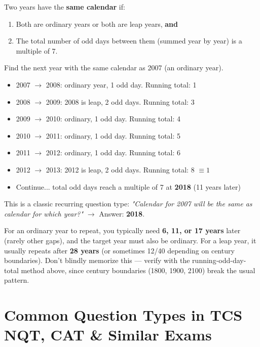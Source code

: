 \documentclass[11pt]{article}
\begin{document}
\begin{formulabox}[Rule]
Two years have the \textbf{same calendar} if:
\begin{enumerate}[leftmargin=1.4em]
  \item Both are ordinary years or both are leap years, \textbf{and}
  \item The total number of odd days between them (summed year by year) is a multiple of 7.
\end{enumerate}
\end{formulabox}

\begin{examplebox}[Example]
Find the next year with the same calendar as 2007 (an ordinary year).
\begin{itemize}[leftmargin=1.4em]
  \item 2007 $\to$ 2008: ordinary year, 1 odd day. Running total: 1
  \item 2008 $\to$ 2009: 2008 is leap, 2 odd days. Running total: 3
  \item 2009 $\to$ 2010: ordinary, 1 odd day. Running total: 4
  \item 2010 $\to$ 2011: ordinary, 1 odd day. Running total: 5
  \item 2011 $\to$ 2012: ordinary, 1 odd day. Running total: 6
  \item 2012 $\to$ 2013: 2012 is leap, 2 odd days. Running total: 8 $\equiv 1$
  \item Continue... total odd days reach a multiple of 7 at \textbf{2018} (11 years later)
\end{itemize}
This is a classic recurring question type: \emph{"Calendar for 2007 will be the same as calendar for
which year?"} $\to$ Answer: \textbf{2018}.
\end{examplebox}

\begin{tipbox}
For an ordinary year to repeat, you typically need \textbf{6, 11, or 17 years} later (rarely other
gaps), and the target year must also be ordinary. For a leap year, it usually repeats after
\textbf{28 years} (or sometimes 12/40 depending on century boundaries). Don't blindly memorize this
--- verify with the running-odd-day-total method above, since century boundaries (1800, 1900, 2100)
break the usual pattern.
\end{tipbox}

\section{Common Question Types in TCS NQT, CAT \& Similar Exams}
\end{document}
